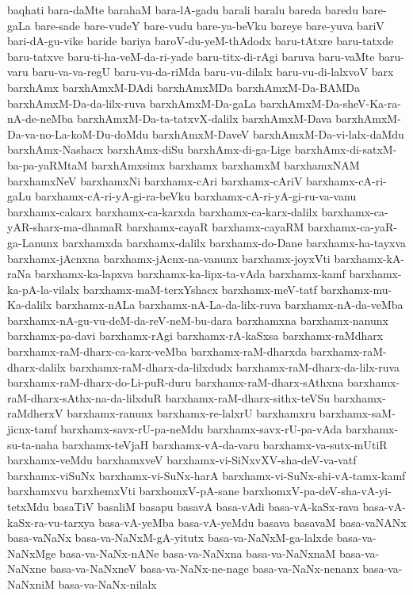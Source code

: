 {baqhati
bara-daMte
barahaM
bara-lA-gadu
barali
baralu
bareda
baredu
bare-gaLa
bare-sade
bare-vudeY
bare-vudu
bare-ya-beVku
bareye
bare-yuva
bariV
bari-dA-gu-vike
baride
bariya
baroV-du-yeM-thAdodx
baru-tAtxre
baru-tatxde
baru-tatxve
baru-ti-ha-veM-da-ri-yade
baru-titx-di-rAgi
baruva
baru-vaMte
baru-varu
baru-va-va-regU
baru-vu-da-riMda
baru-vu-dilalx
baru-vu-di-lalxvoV
barx
barxhAmx
barxhAmxM-DAdi
barxhAmxMDa
barxhAmxM-Da-BAMDa
barxhAmxM-Da-da-lilx-ruva
barxhAmxM-Da-gaLa
barxhAmxM-Da-sheV-Ka-ra-nA-de-neMba
barxhAmxM-Da-ta-tatxvX-dalilx
barxhAmxM-Dava
barxhAmxM-Da-va-no-La-koM-Du-doMdu
barxhAmxM-DaveV
barxhAmxM-Da-vi-lalx-daMdu
barxhAmx-Nashacx
barxhAmx-diSu
barxhAmx-di-ga-Lige
barxhAmx-di-satxM-ba-pa-yaRMtaM
barxhAmxsimx
barxhamx
barxhamxM
barxhamxNAM
barxhamxNeV
barxhamxNi
barxhamx-cAri
barxhamx-cAriV
barxhamx-cA-ri-gaLu
barxhamx-cA-ri-yA-gi-ra-beVku
barxhamx-cA-ri-yA-gi-ru-va-vanu
barxhamx-cakarx
barxhamx-ca-karxda
barxhamx-ca-karx-dalilx
barxhamx-ca-yAR-sharx-ma-dhamaR
barxhamx-cayaR
barxhamx-cayaRM
barxhamx-ca-yaR-ga-Lanunx
barxhamxda
barxhamx-dalilx
barxhamx-do-Dane
barxhamx-ha-tayxva
barxhamx-jAcnxna
barxhamx-jAcnx-na-vanunx
barxhamx-joyxVti
barxhamx-kA-raNa
barxhamx-ka-lapxva
barxhamx-ka-lipx-ta-vAda
barxhamx-kamf
barxhamx-ka-pA-la-vilalx
barxhamx-maM-terxYshacx
barxhamx-meV-tatf
barxhamx-mu-Ka-dalilx
barxhamx-nALa
barxhamx-nA-La-da-lilx-ruva
barxhamx-nA-da-veMba
barxhamx-nA-gu-vu-deM-da-reV-neM-bu-dara
barxhamxna
barxhamx-nanunx
barxhamx-pa-davi
barxhamx-rAgi
barxhamx-rA-kaSxsa
barxhamx-raMdharx
barxhamx-raM-dharx-ca-karx-veMba
barxhamx-raM-dharxda
barxhamx-raM-dharx-dalilx
barxhamx-raM-dharx-da-lilxdudx
barxhamx-raM-dharx-da-lilx-ruva
barxhamx-raM-dharx-do-Li-puR-duru
barxhamx-raM-dharx-sAthxna
barxhamx-raM-dharx-sAthx-na-da-lilxduR
barxhamx-raM-dharx-sithx-teVSu
barxhamx-raMdherxV
barxhamx-ranunx
barxhamx-re-lalxrU
barxhamxru
barxhamx-saM-jicnx-tamf
barxhamx-savx-rU-pa-neMdu
barxhamx-savx-rU-pa-vAda
barxhamx-su-ta-naha
barxhamx-teVjaH
barxhamx-vA-da-varu
barxhamx-va-sutx-mUtiR
barxhamx-veMdu
barxhamxveV
barxhamx-vi-SiNxvXV-sha-deV-va-vatf
barxhamx-viSuNx
barxhamx-vi-SuNx-harA
barxhamx-vi-SuNx-shi-vA-tamx-kamf
barxhamxvu
barxhemxVti
barxhomxV-pA-sane
barxhomxV-pa-deV-sha-vA-yi-tetxMdu
basaTiV
basaliM
basapu
basavA
basa-vAdi
basa-vA-kaSx-rava
basa-vA-kaSx-ra-vu-tarxya
basa-vA-yeMba
basa-vA-yeMdu
basava
basavaM
basa-vaNANx
basa-vaNaNx
basa-va-NaNxM-gA-yitutx
basa-va-NaNxM-ga-lalxde
basa-va-NaNxMge
basa-va-NaNx-nANe
basa-va-NaNxna
basa-va-NaNxnaM
basa-va-NaNxne
basa-va-NaNxneV
basa-va-NaNx-ne-nage
basa-va-NaNx-nenanx
basa-va-NaNxniM
basa-va-NaNx-nilalx
}

